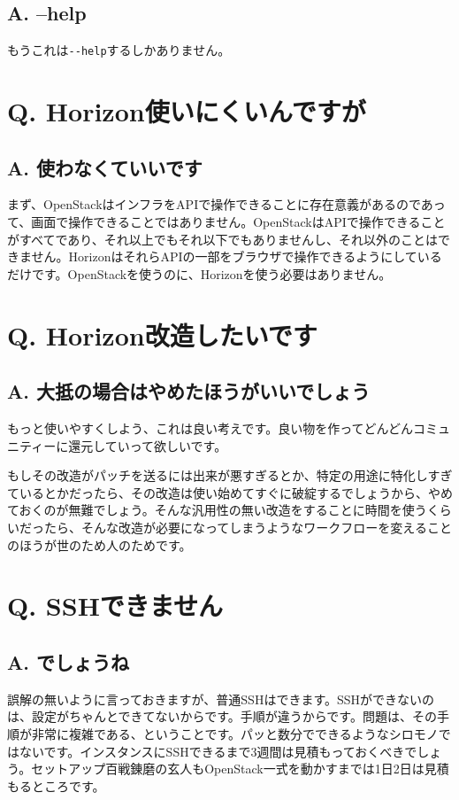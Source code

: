\documentclass[9pt,b5paper,tombo,openany]{jsbook}
\begin{document}
\subsection*{A. --help}
もうこれは\verb|--help|するしかありません。

\section*{Q. Horizon使いにくいんですが}
\subsection*{A. 使わなくていいです}
まず、OpenStackはインフラをAPIで操作できることに存在意義があるのであって、画面で操作できることではありません。OpenStackはAPIで操作できることがすべてであり、それ以上でもそれ以下でもありませんし、それ以外のことはできません。HorizonはそれらAPIの一部をブラウザで操作できるようにしているだけです。OpenStackを使うのに、Horizonを使う必要はありません。

\section*{Q. Horizon改造したいです}
\subsection*{A. 大抵の場合はやめたほうがいいでしょう}
もっと使いやすくしよう、これは良い考えです。良い物を作ってどんどんコミュニティーに還元していって欲しいです。

もしその改造がパッチを送るには出来が悪すぎるとか、特定の用途に特化しすぎているとかだったら、その改造は使い始めてすぐに破綻するでしょうから、やめておくのが無難でしょう。そんな汎用性の無い改造をすることに時間を使うくらいだったら、そんな改造が必要になってしまうようなワークフローを変えることのほうが世のため人のためです。

\section*{Q. SSHできません}
\subsection*{A. でしょうね}
誤解の無いように言っておきますが、普通SSHはできます。SSHができないのは、設定がちゃんとできてないからです。手順が違うからです。問題は、その手順が非常に複雑である、ということです。パッと数分でできるようなシロモノではないです。インスタンスにSSHできるまで3週間は見積もっておくべきでしょう。セットアップ百戦錬磨の玄人もOpenStack一式を動かすまでは1日2日は見積もるところです。
\end{document}
